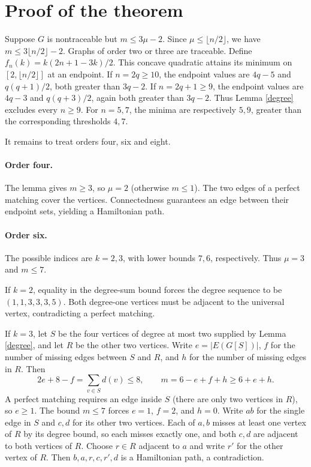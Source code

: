 \documentclass[11pt,a4paper]{article}
\begin{document}
\section{Proof of the theorem}
Suppose $G$ is nontraceable but $m\le3\mu-2$. Since $\mu\le\lfloor n/2\rfloor$, we have $m\le3\lfloor n/2\rfloor-2$. Graphs of order two or three are traceable. Define $f_n(k)=k(2n+1-3k)/2$. This concave quadratic attains its minimum on $[2,\lfloor n/2\rfloor]$ at an endpoint. If $n=2q\ge10$, the endpoint values are $4q-5$ and $q(q+1)/2$, both greater than $3q-2$. If $n=2q+1\ge9$, the endpoint values are $4q-3$ and $q(q+3)/2$, again both greater than $3q-2$. Thus Lemma \ref{degree} excludes every $n\ge9$. For $n=5,7$, the minima are respectively $5,9$, greater than the corresponding thresholds $4,7$.

It remains to treat orders four, six and eight.

\paragraph{Order four.}
The lemma gives $m\ge3$, so $\mu=2$ (otherwise $m\le1$). The two edges of a perfect matching cover the vertices. Connectedness guarantees an edge between their endpoint sets, yielding a Hamiltonian path.

\paragraph{Order six.}
The possible indices are $k=2,3$, with lower bounds $7,6$, respectively. Thus $\mu=3$ and $m\le7$.

If $k=2$, equality in the degree-sum bound forces the degree sequence to be $(1,1,3,3,3,5)$. Both degree-one vertices must be adjacent to the universal vertex, contradicting a perfect matching.

If $k=3$, let $S$ be the four vertices of degree at most two supplied by Lemma \ref{degree}, and let $R$ be the other two vertices. Write $e=|E(G[S])|$, $f$ for the number of missing edges between $S$ and $R$, and $h$ for the number of missing edges in $R$. Then
\[
2e+8-f=\sum_{v\in S}d(v)\le8,\qquad
m=6-e+f+h\ge6+e+h.
\]
A perfect matching requires an edge inside $S$ (there are only two vertices in $R$), so $e\ge1$. The bound $m\le7$ forces $e=1$, $f=2$, and $h=0$. Write $ab$ for the single edge in $S$ and $c,d$ for its other two vertices. Each of $a,b$ misses at least one vertex of $R$ by its degree bound, so each misses exactly one, and both $c,d$ are adjacent to both vertices of $R$. Choose $r\in R$ adjacent to $a$ and write $r'$ for the other vertex of $R$. Then $b,a,r,c,r',d$ is a Hamiltonian path, a contradiction.
\end{document}
